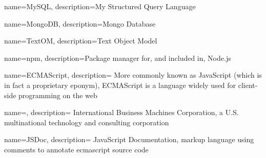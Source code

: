 

{
  name=MySQL,
  description={My Structured Query Language}
}

{
  name=MongoDB,
  description={Mongo Database}
}

{
  name=TextOM,
  description={Text Object Model}
}

{
  name=npm,
  description={Package manager for, and included in, Node.js}
}

{
  name={ECMAScript},
  description={
    More commonly known as JavaScript (which is in fact a proprietary
    eponym), ECMAScript is a language widely used for
    client-side programming on the web}
}

{
  name=,
  description={
    International Business Machines Corporation, a U.S. multinational
    technology and consulting corporation}
}

{
  name={JSDoc},
  description={
    JavaScript Documentation, markup language using comments to annotate
    \gls{ecmascript} source code}
}
